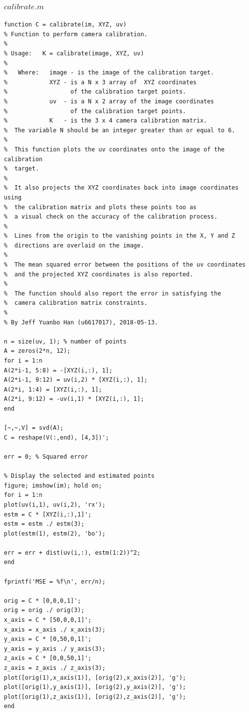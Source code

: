 \documentclass{article}
\begin{document}
\subsubsection{$calibrate.m$}
\label{code-2.1}
\begin{lstlisting}
function C = calibrate(im, XYZ, uv)
% Function to perform camera calibration.
%
% Usage:   K = calibrate(image, XYZ, uv)
%
%   Where:   image - is the image of the calibration target.
%            XYZ - is a N x 3 array of  XYZ coordinates
%                  of the calibration target points. 
%            uv  - is a N x 2 array of the image coordinates
%                  of the calibration target points.
%            K   - is the 3 x 4 camera calibration matrix.
%  The variable N should be an integer greater than or equal to 6.
%
%  This function plots the uv coordinates onto the image of the calibration
%  target. 
%
%  It also projects the XYZ coordinates back into image coordinates using
%  the calibration matrix and plots these points too as 
%  a visual check on the accuracy of the calibration process.
%
%  Lines from the origin to the vanishing points in the X, Y and Z
%  directions are overlaid on the image. 
%
%  The mean squared error between the positions of the uv coordinates 
%  and the projected XYZ coordinates is also reported.
%
%  The function should also report the error in satisfying the 
%  camera calibration matrix constraints.
%
% By Jeff Yuanbo Han (u6617017), 2018-05-13.

n = size(uv, 1); % number of points
A = zeros(2*n, 12);
for i = 1:n
A(2*i-1, 5:8) = -[XYZ(i,:), 1];
A(2*i-1, 9:12) = uv(i,2) * [XYZ(i,:), 1];
A(2*i, 1:4) = [XYZ(i,:), 1];
A(2*i, 9:12) = -uv(i,1) * [XYZ(i,:), 1];
end

[~,~,V] = svd(A);
C = reshape(V(:,end), [4,3])';

err = 0; % Squared error

% Display the selected and estimated points
figure; imshow(im); hold on;
for i = 1:n
plot(uv(i,1), uv(i,2), 'rx');
estm = C * [XYZ(i,:),1]';
estm = estm ./ estm(3);
plot(estm(1), estm(2), 'bo');

err = err + dist(uv(i,:), estm(1:2))^2;
end

fprintf('MSE = %f\n', err/n);

orig = C * [0,0,0,1]';
orig = orig ./ orig(3);
x_axis = C * [50,0,0,1]';
x_axis = x_axis ./ x_axis(3);
y_axis = C * [0,50,0,1]';
y_axis = y_axis ./ y_axis(3);
z_axis = C * [0,0,50,1]';
z_axis = z_axis ./ z_axis(3);
plot([orig(1),x_axis(1)], [orig(2),x_axis(2)], 'g');
plot([orig(1),y_axis(1)], [orig(2),y_axis(2)], 'g');
plot([orig(1),z_axis(1)], [orig(2),z_axis(2)], 'g');
end

\end{lstlisting}
\end{document}
